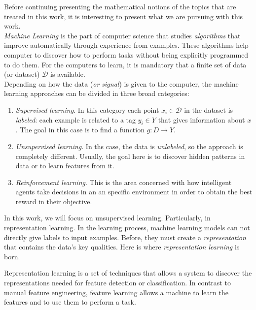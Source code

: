 


Before continuing presenting the mathematical notions of the topics that are treated in this work, it is interesting to present what we are pursuing with this work.\\

\emph{Machine Learning} is the part of computer science that studies \emph{algorithms} that improve automatically through experience from examples. These algorithms help computer to discover how to
perform tasks without being explicitly programmed to do them. For the computers to learn, it is mandatory that a finite set of data (or dataset) $\mathcal D$ is available. \\

Depending on how the data (\emph{or signal}) is given to the computer, the machine learning approaches can be divided in three broad categories:
\begin{enumerate}
    \item \emph{Supervised learning}. In this category each point $x_i \in \mathcal D$ in the dataset is \emph{labeled}: each example is related to a tag $y_i \in Y$ that gives information about $x$. The goal in this case is to find 
    a function $g:D \to Y$.
    \item \emph{Unsupervised learning}. In ths case, the data is \emph{unlabeled}, so the approach is completely different. Usually, the goal here is to discover hidden patterns in data or to learn features from it.
    \item \emph{Reinforcement learning}. This is the area concerned with how intelligent agents take decisions in an an specific environment in order to obtain the best reward in their objective.
\end{enumerate}

In this work, we will focus on unsupervised learning. Particularly, in representation learning. In the learning process, machine learning models can not directly give labels to input examples. Before, they must create a \emph{representation} that 
contains the data's key qualities.  Here is where \emph{representation learning} is born. 


Representation learning is a set of techniques that allows a system to discover the representations needed for feature detection or classification. 
In contrast to manual feature engineering, feature learning allows a machine to learn the features and to use them to perform a task.\\

